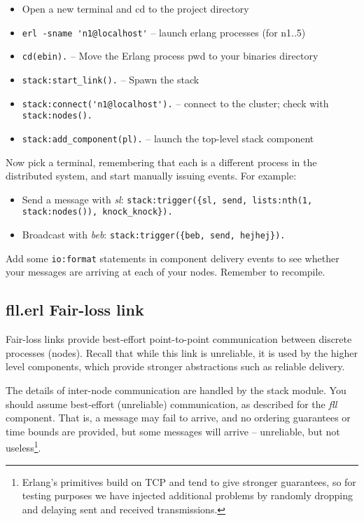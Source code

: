 \documentclass[a4paper]{article}
\begin{document}
\begin{itemize}

  \item Open a new terminal and cd to the project directory

  \item \verb!erl -sname 'n1@localhost'! -- launch erlang processes (for n1..5)

  \item \verb!cd(ebin).! -- Move the Erlang process pwd to your binaries directory

  \item \verb!stack:start_link().! -- Spawn the stack

  \item \verb!stack:connect('n1@localhost').! -- connect to the cluster; check
  with \verb!stack:nodes().!

  \item \verb!stack:add_component(pl).! -- launch the top-level stack component

\end{itemize}

Now pick a terminal, remembering that each is a different process in the
distributed system, and start manually issuing events. For example:

\begin{itemize}
  \item Send a message with \emph{sl}: \verb!stack:trigger({sl, send, lists:nth(1, stack:nodes()), knock_knock}).!
  \item Broadcast with \emph{beb}: \verb!stack:trigger({beb, send, hejhej}).!
\end{itemize}

Add some \verb!io:format! statements in component delivery events to see
whether your messages are arriving at each of your nodes. Remember to
recompile.


\subsection{fll.erl Fair-loss link} %
\label{ssub:fll_erl}

Fair-loss links provide best-effort point-to-point communication between
discrete processes (nodes). Recall that while this link is unreliable, it is
used by the higher level components, which provide stronger abstractions such
as reliable delivery.

The details of inter-node communication are handled by the stack module. You
should assume best-effort (unreliable) communication, as described for the
\emph{fll} component. That is, a message may fail to arrive, and no ordering
guarantees or time bounds are provided, but some messages will arrive --
unreliable, but not useless\footnote{Erlang's primitives build on TCP and tend
to give stronger guarantees, so for testing purposes we have injected
additional problems by randomly dropping and delaying sent and received
transmissions.}.
\end{document}
